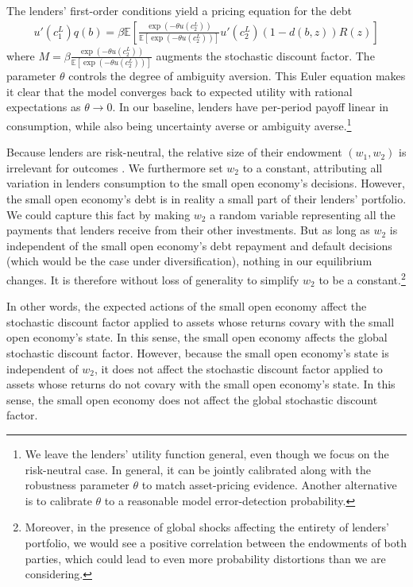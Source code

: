 The lenders' first-order conditions yield a pricing equation for the debt
\begin{align*}
	u'(c_1^L) q(b) = \beta \mathbb{E}\left[ \frac{\exp(-\theta u(c_2^L))}{\mathbb{E}\left[\exp(-\theta u(c_2^L))\right]} u'(c_2^L) (1-d(b,z)) R(z) \right]
\end{align*}
where $M = \beta \frac{\exp(-\theta u(c_2^L))}{\mathbb{E}\left[\exp(-\theta u(c_2^L))\right]}$ augments the stochastic discount factor. The parameter $\theta$ controls the degree of ambiguity aversion. This Euler equation makes it clear that the model converges back to expected utility with rational expectations as $\theta \to 0$. In our baseline, lenders have per-period payoff linear in consumption, while also being uncertainty averse or ambiguity averse.\footnote{We leave the lenders' utility function general, even though we focus on the risk-neutral case. In general, it can be jointly calibrated along with the robustness parameter $\theta$ to match asset-pricing evidence. Another alternative is to calibrate $\theta$ to a reasonable model error-detection probability.}

Because lenders are risk-neutral, the relative size of their endowment $(w_1, w_2)$ is irrelevant for outcomes \citep[see][for a proof in the context of noncontingent debt]{PouzoPresno2016}. We furthermore set $w_2$ to a constant, attributing all variation in lenders consumption to the small open economy's decisions. However, the small open economy's debt is in reality a small part of their lenders' portfolio. We could capture this fact by making $w_2$ a random variable representing all the payments that lenders receive from their other investments. But as long as $w_2$ is independent of the small open economy's debt repayment and default decisions (which would be the case under diversification), nothing in our equilibrium changes. It is therefore without loss of generality to simplify $w_2$ to be a constant.\footnote{Moreover, in the presence of global shocks affecting the entirety of lenders' portfolio, we would see a positive correlation between the endowments of both parties, which could lead to even more probability distortions than we are considering.}

In other words, the expected actions of the small open economy affect the stochastic discount factor applied to assets whose returns covary with the small open economy's state. In this sense, the small open economy affects the global stochastic discount factor. However, because the small open economy's state is independent of $w_2$, it does not affect the stochastic discount factor applied to assets whose returns do not covary with the small open economy's state. In this sense, the small open economy does not affect the global stochastic discount factor.

